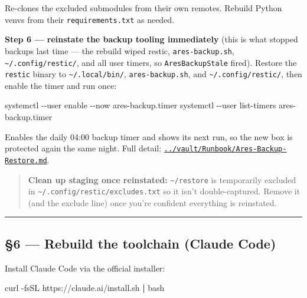 \documentclass[
]{article}
\newenvironment{Shaded}{\begin{snugshade}}{\end{snugshade}}
\newcommand{\AttributeTok}[1]{\textcolor[rgb]{0.77,0.63,0.00}{#1}}
\newcommand{\ExtensionTok}[1]{#1}
\newcommand{\FunctionTok}[1]{\textcolor[rgb]{0.00,0.00,0.00}{#1}}
\newcommand{\KeywordTok}[1]{\textcolor[rgb]{0.13,0.29,0.53}{\textbf{#1}}}
\newcommand{\NormalTok}[1]{#1}
\begin{document}
Re-clones the excluded submodules from their own remotes. Rebuild Python
venvs from their \texttt{requirements.txt} as needed.

\textbf{Step 6 --- reinstate the backup tooling immediately} (this is
what stopped backups last time --- the rebuild wiped restic,
\texttt{ares-backup.sh}, \texttt{\textasciitilde{}/.config/restic/}, and
all user timers, so \texttt{AresBackupStale} fired). Restore the
\texttt{restic} binary to \texttt{\textasciitilde{}/.local/bin/},
\texttt{ares-backup.sh}, and \texttt{\textasciitilde{}/.config/restic/},
then enable the timer and run once:

\begin{Shaded}
\begin{Highlighting}[]
\ExtensionTok{systemctl} \AttributeTok{{-}{-}user}\NormalTok{ enable }\AttributeTok{{-}{-}now}\NormalTok{ ares{-}backup.timer}
\ExtensionTok{systemctl} \AttributeTok{{-}{-}user}\NormalTok{ list{-}timers ares{-}backup.timer}
\end{Highlighting}
\end{Shaded}

Enables the daily 04:00 backup timer and shows its next run, so the new
box is protected again the same night. Full detail:
\href{../vault/Runbook/Ares-Backup-Restore.md}{\texttt{../vault/Runbook/Ares-Backup-Restore.md}}.

\begin{quote}
\textbf{Clean up staging once reinstated:}
\texttt{\textasciitilde{}/restore} is temporarily excluded in
\texttt{\textasciitilde{}/.config/restic/excludes.txt} so it isn't
double-captured. Remove it (and the exclude line) once you're confident
everything is reinstated.
\end{quote}

\begin{center}\rule{0.5\linewidth}{0.5pt}\end{center}

\hypertarget{rebuild-the-toolchain-claude-code}{%
\subsection{§6 --- Rebuild the toolchain (Claude
Code)}\label{rebuild-the-toolchain-claude-code}}

Install Claude Code via the official installer:

\begin{Shaded}
\begin{Highlighting}[]
\ExtensionTok{curl} \AttributeTok{{-}fsSL}\NormalTok{ https://claude.ai/install.sh }\KeywordTok{|} \FunctionTok{bash}
\end{Highlighting}
\end{Shaded}
\end{document}
